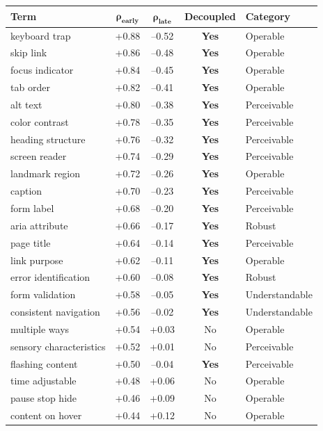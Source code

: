 \documentclass[10pt]{article} %
\begin{document}
\begin{table}[H]
\centering
\scriptsize
\begin{tabular}{|l|c|c|c|l|}
\hline
\textbf{Term} & $\mathbf{\rho_\text{early}}$ & $\mathbf{\rho_\text{late}}$ & \textbf{Decoupled} & \textbf{Category} \\
\hline
keyboard trap & +0.88 & --0.52 & \textbf{Yes} & Operable \\
skip link & +0.86 & --0.48 & \textbf{Yes} & Operable \\
focus indicator & +0.84 & --0.45 & \textbf{Yes} & Operable \\
tab order & +0.82 & --0.41 & \textbf{Yes} & Operable \\
alt text & +0.80 & --0.38 & \textbf{Yes} & Perceivable \\
color contrast & +0.78 & --0.35 & \textbf{Yes} & Perceivable \\
heading structure & +0.76 & --0.32 & \textbf{Yes} & Perceivable \\
screen reader & +0.74 & --0.29 & \textbf{Yes} & Perceivable \\
landmark region & +0.72 & --0.26 & \textbf{Yes} & Operable \\
caption & +0.70 & --0.23 & \textbf{Yes} & Perceivable \\
form label & +0.68 & --0.20 & \textbf{Yes} & Perceivable \\
aria attribute & +0.66 & --0.17 & \textbf{Yes} & Robust \\
page title & +0.64 & --0.14 & \textbf{Yes} & Perceivable \\
link purpose & +0.62 & --0.11 & \textbf{Yes} & Operable \\
error identification & +0.60 & --0.08 & \textbf{Yes} & Robust \\
form validation & +0.58 & --0.05 & \textbf{Yes} & Understandable \\
consistent navigation & +0.56 & --0.02 & \textbf{Yes} & Understandable \\
multiple ways & +0.54 & +0.03 & No & Operable \\
sensory characteristics & +0.52 & +0.01 & No & Perceivable \\
flashing content & +0.50 & --0.04 & \textbf{Yes} & Perceivable \\
time adjustable & +0.48 & +0.06 & No & Operable \\
pause stop hide & +0.46 & +0.09 & No & Operable \\
content on hover & +0.44 & +0.12 & No & Operable \\

\end{tabular}
\end{table}
\end{document}
